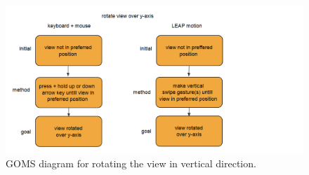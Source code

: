 \begin{appendix}
\begin{figure}[!htbp]
\includegraphics[width=\textwidth]{imgs/rotateviewy.png}
\caption{GOMS diagram for rotating the view in vertical direction.}
\label{fig:rotateviewy}
\end{figure}

\end{appendix}